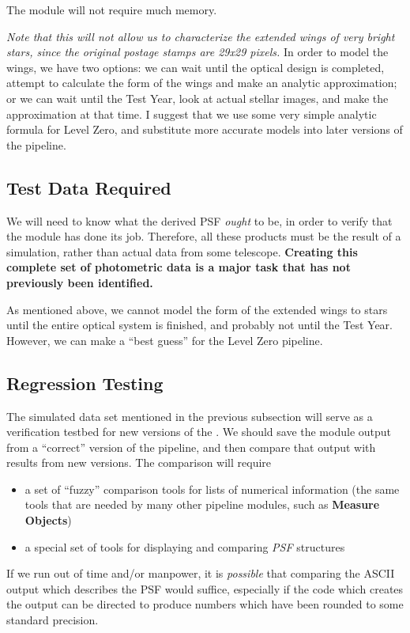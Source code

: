   The \fpsf module will not require much
memory.

{\it Note that this will not allow us to characterize the extended
wings of very bright stars, since the original postage stamps are
29x29 pixels.}
In order to model the wings, we have two options:
we can wait until the optical design is completed, 
attempt to calculate the form of the wings and 
make an analytic approximation;
or we can wait until the Test Year, look at actual
stellar images, and make the approximation at that time.
I suggest that we use some very simple analytic formula
for Level Zero, and substitute more accurate models into
later versions of the pipeline.

\subsection {Test Data Required}

  We will need to know what the derived PSF
{\it ought} to be, in order to verify that the module has 
done its job.  Therefore, all these products must be the result
of a simulation, rather than actual data from some telescope.
{\bf Creating this complete set of photometric data is a major
task that has not previously been identified.}

  As mentioned above, we cannot model the form of the extended
wings to stars until the entire optical system is finished,
and probably not until the Test Year.  However, we can make
a ``best guess'' for the Level Zero pipeline.

\subsection {Regression Testing}

  The simulated data set mentioned in the previous subsection 
will serve as a verification testbed for new versions of the
\fpsf .  We should save the module output from a
``correct'' version of the pipeline, and then compare that
output with results from new versions.  The comparison will 
require 

\begin{itemize}
  \item a set of ``fuzzy'' comparison tools for lists of numerical
        information (the same tools that are needed by many other
        pipeline modules, such as {\bf Measure Objects})
  \item a special set of tools for displaying and comparing
        {\it PSF} structures
\end{itemize}

If we run out of time and/or manpower, it is {\it possible} that
comparing the ASCII output which describes the PSF would suffice,
especially if the code which creates the output can be directed
to produce numbers which have been rounded to some standard precision.

